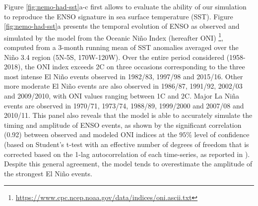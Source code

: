  Figure \ref{fig:nemo-had-sst}a-c first allows to evaluate the ability of our simulation to reproduce the ENSO signature in sea surface temperature (SST). Figure \ref{fig:nemo-had-sst}a presents the temporal evolution of ENSO as observed and simulated by the model from the Oceanic Niño Index (hereafter ONI) \footnote{\url{https://www.cpc.ncep.noaa.gov/data/indices/oni.ascii.txt}}, computed from a 3-month running mean of SST anomalies averaged over the Niño 3.4 region (5N-5S, 170W-120W). Over the entire period considered (1958-2018), the ONI index exceeds 2\degree{}C on three occasions corresponding to the three most intense El Niño events observed in 1982/83, 1997/98 and 2015/16. Other more moderate El Niño events are also observed in 1986/87, 1991/92, 2002/03 and 2009/2010, with ONI values ranging between 1\degree{}C and 2\degree{}C. Major La Niña events are observed in 1970/71, 1973/74, 1988/89, 1999/2000 and 2007/08 and 2010/11. This panel also reveals that the model is able to accurately simulate the timing and amplitude of ENSO events, as shown by the significant correlation (0.92) between observed and modeled ONI indices at the $95\%$ level of confidence (based on Student's t-test with an effective number of degrees of freedom that is corrected based on the 1-lag autocorrelation of each time-series, as reported in \citealp{brethertonEffectiveNumberSpatial1999}). Despite this general agreement, the model tends to overestimate the amplitude of the strongest El Niño events. 

